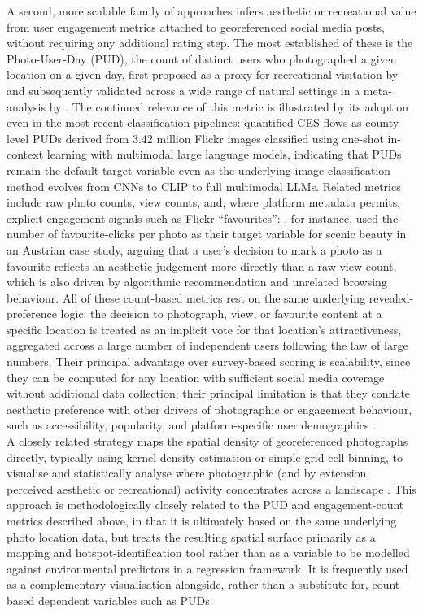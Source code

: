 \documentclass[hidelinks, 11pt]{article}
\begin{document}
A second, more scalable family of approaches infers aesthetic or recreational value from user engagement metrics attached to georeferenced social media posts, without requiring any additional rating step. The most established of these is the Photo-User-Day (PUD), the count of distinct users who photographed a given location on a given day, first proposed as a proxy for recreational visitation by \citet{wood_using_2013} and subsequently validated across a wide range of natural settings in a meta-analysis by \citet{ghermandi_geolocated_2022}. The continued relevance of this metric is illustrated by its adoption even in the most recent classification pipelines: \citet{liao_oneshot_2025} quantified CES flows as county-level PUDs derived from 3.42 million Flickr images classified using one-shot in-context learning with multimodal large language models, indicating that PUDs remain the default target variable even as the underlying image classification method evolves from CNNs to CLIP to full multimodal LLMs. Related metrics include raw photo counts, view counts, and, where platform metadata permits, explicit engagement signals such as Flickr ``favourites'': \citet{despotovic_beautiful_2025}, for instance, used the number of favourite-clicks per photo as their target variable for scenic beauty in an Austrian case study, arguing that a user's decision to mark a photo as a favourite reflects an aesthetic judgement more directly than a raw view count, which is also driven by algorithmic recommendation and unrelated browsing behaviour. All of these count-based metrics rest on the same underlying revealed-preference logic: the decision to photograph, view, or favourite content at a specific location is treated as an implicit vote for that location's attractiveness, aggregated across a large number of independent users following the law of large numbers. Their principal advantage over survey-based scoring is scalability, since they can be computed for any location with sufficient social media coverage without additional data collection; their principal limitation is that they conflate aesthetic preference with other drivers of photographic or engagement behaviour, such as accessibility, popularity, and platform-specific user demographics \citep{ghermandi_geolocated_2022}.
\\
A closely related strategy maps the spatial density of georeferenced photographs directly, typically using kernel density estimation or simple grid-cell binning, to visualise and statistically analyse where photographic (and by extension, perceived aesthetic or recreational) activity concentrates across a landscape \citep{langemeyer_mapping_2018,van_zanten_continental-scale_2016}. This approach is methodologically closely related to the PUD and engagement-count metrics described above, in that it is ultimately based on the same underlying photo location data, but treats the resulting spatial surface primarily as a mapping and hotspot-identification tool rather than as a variable to be modelled against environmental predictors in a regression framework. It is frequently used as a complementary visualisation alongside, rather than a substitute for, count-based dependent variables such as PUDs.
\end{document}
